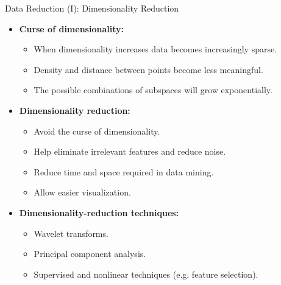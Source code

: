 \begin{frame}{Data Reduction (I): Dimensionality Reduction}
	\begin{itemize}
		\item \textbf{Curse of dimensionality:}
		      \begin{itemize}
			      \item When dimensionality increases data becomes increasingly
			            sparse.
			      \item Density and distance between points become less meaningful.
			      \item The possible combinations of subspaces will grow
			            exponentially.
		      \end{itemize}
		\item \textbf{Dimensionality reduction:}
		      \begin{itemize}
			      \item Avoid the curse of dimensionality.
			      \item Help eliminate irrelevant features and reduce noise.
			      \item Reduce time and space required in data mining.
			      \item Allow easier visualization.
		      \end{itemize}
		\item \textbf{Dimensionality-reduction techniques:}
		      \begin{itemize}
			      \item Wavelet transforms.
			      \item Principal component analysis.
			      \item Supervised and nonlinear techniques (e.g. feature selection).
		      \end{itemize}
	\end{itemize}
\end{frame}

